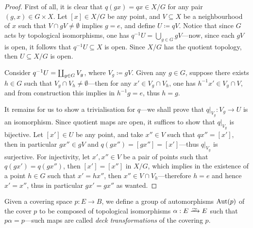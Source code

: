 \begin{proof}
    First of all, it is clear that \(q(g x) = q x \in X/G\) for any pair
    \((g, x) \in G \times X\). Let \([x] \in X/G\) be any point, and
    \(V \subseteq X\) be a neighbourhood of \(x\) such that
    \(V \cap g V \neq \emptyset\) implies \(g = e\), and define \(U \coloneq q
    V\). Notice that since \(G\) acts by topological isomorphisms, one has
    \(q^{-1} U = \bigcup_{g \in G} g V\)---now, since each \(g V\) is open, it
    follows that \(q^{-1} U \subseteq X\) is open. Since \(X/G\) has the quotient
    topology, then \(U \subseteq X/G\) is open.

    Consider \(q^{-1} U = \coprod_{g \in G} V_g\), where \(V_g \coloneq g
    V\). Given any \(g \in G\), suppose there exists \(h \in G\) such that
    \(V_g \cap V_h \neq \emptyset\)---then for any \(x' \in V_g \cap V_h\), one has
    \(h^{-1} x' \in V_g \cap V\), and from construction this implies in
    \(h^{-1} g = e\), thus \(h = g\).

    It remains for us to show a trivialisation for \(q\)---we shall prove that
    \(q|_{V_g}: V_g \to U\) is an isomorphism. Since quotient maps are open, it
    suffices to show that \(q|_{V_g}\) is bijective. Let \([x'] \in U\) be any
    point, and take \(x'' \in V\) such that \(q x'' = [x']\), then in particular
    \(g x'' \in g V\) and \(q(g x'') = [g x''] = [x']\)---thus \(q|_{V_g}\) is
    surjective. For injectivity, let \(x', x'' \in V\) be a pair of points such that
    \(q(g x') = q(g x'')\), then \([x'] = [x'']\) in \(X/G\), which implies in the
    existence of a point \(h \in G\) such that \(x' = h x''\), then
    \(x'' \in V \cap V_h\)---therefore \(h = e\) and hence \(x' = x''\), thus in
    particular \(g x' = g x''\) as wanted.
\end{proof}

\begin{definition}
    \label{def:deck-transformations}
    Given a covering space \(p: E \to B\), we define a group of automorphisms
    \(\operatorname{Aut}(p)\) of the cover \(p\) to be composed of topological isomorphisms
    \(\alpha: E \isoto E\) such that \(p \alpha = p\)---such maps are called
    \emph{deck transformations} of the covering \(p\).
\end{definition}


